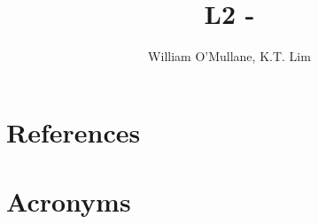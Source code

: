 \documentclass[OPS,authoryear,toc]{lsstdoc}
\title{L2 - \milestone}
\author{%
William O'Mullane, K.T. Lim
}
\date{\vcsDate}
\begin{document}
\maketitle



\appendix
\section{References} \label{sec:bib}
\renewcommand{\refname}{} %


\section{Acronyms} \label{sec:acronyms}

\end{document}
